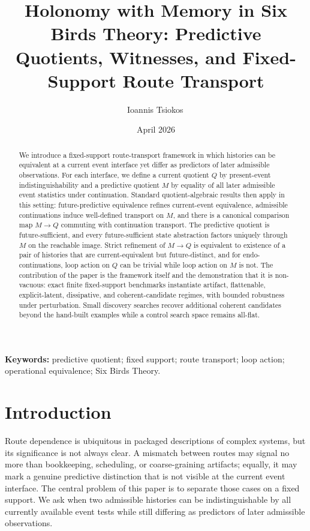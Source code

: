 \documentclass[11pt]{article}
\title{Holonomy with Memory in Six Birds Theory: Predictive Quotients, Witnesses, and Fixed-Support Route Transport}
\author{Ioannis Tsiokos\,\orcidlink{0009-0009-7659-5964}}
\date{April 2026}
\newcommand{\CurrentQ}{Q}
\newcommand{\PredictiveQ}{M}
\theoremstyle{definition}
\begin{document}
\maketitle
\thispagestyle{firstpage}

\begin{abstract}
We introduce a fixed-support route-transport framework in which histories can be equivalent at a current event interface yet differ as predictors of later admissible observations. For each interface, we define a current quotient $\CurrentQ$ by present-event indistinguishability and a predictive quotient $\PredictiveQ$ by equality of all later admissible event statistics under continuation. Standard quotient-algebraic results then apply in this setting: future-predictive equivalence refines current-event equivalence, admissible continuations induce well-defined transport on $\PredictiveQ$, and there is a canonical comparison map $\PredictiveQ \to \CurrentQ$ commuting with continuation transport. The predictive quotient is future-sufficient, and every future-sufficient state abstraction factors uniquely through $\PredictiveQ$ on the reachable image. Strict refinement of $\PredictiveQ \to \CurrentQ$ is equivalent to existence of a pair of histories that are current-equivalent but future-distinct, and for endo-continuations, loop action on $\CurrentQ$ can be trivial while loop action on $\PredictiveQ$ is not. The contribution of the paper is the framework itself and the demonstration that it is non-vacuous: exact finite fixed-support benchmarks instantiate artifact, flattenable, explicit-latent, dissipative, and coherent-candidate regimes, with bounded robustness under perturbation. Small discovery searches recover additional coherent candidates beyond the hand-built examples while a control search space remains all-flat.
\end{abstract}

\medskip
\noindent\textbf{Keywords:} predictive quotient; fixed support; route transport; loop action; operational equivalence; Six Birds Theory.

\section{Introduction}\label{sec:introduction}
Route dependence is ubiquitous in packaged descriptions of complex systems, but its significance is not always clear. A mismatch between routes may signal no more than bookkeeping, scheduling, or coarse-graining artifacts; equally, it may mark a genuine predictive distinction that is not visible at the current event interface. The central problem of this paper is to separate those cases on a fixed support. We ask when two admissible histories can be indistinguishable by all currently available event tests while still differing as predictors of later admissible observations.
\end{document}
